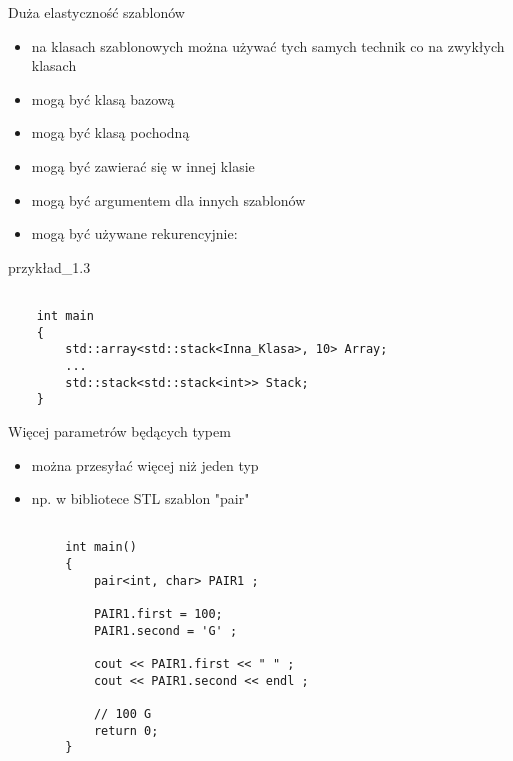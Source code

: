 \documentclass[11pt]{beamer}
\begin{document}
\begin{frame}[fragile]{Duża elastyczność szablonów}
	\begin{itemize}
		\item na klasach szablonowych można używać tych samych technik co na zwykłych klasach
		\item mogą być klasą bazową
		\item mogą być klasą pochodną
		\item mogą być zawierać się w innej klasie
		\item mogą być argumentem dla innych szablonów
		\item mogą być używane rekurencyjnie: 
	\end{itemize}
	\alert{przykład\_1.3}
	
	\begin{lstlisting}[frame=single]  % Start your code-block
		
	int main
	{
		std::array<std::stack<Inna_Klasa>, 10> Array;
		...
		std::stack<std::stack<int>> Stack;
	}
	\end{lstlisting}

\end{frame}



\begin{frame}[fragile]{Więcej parametrów będących typem}
	\begin{itemize}
		\item można przesyłać więcej niż jeden typ
		\item np. w bibliotece STL szablon "pair"
			
	\end{itemize}
	
	\begin{lstlisting}[frame=single]  % Start your code-block
		
		int main()
		{
			pair<int, char> PAIR1 ;
		 
			PAIR1.first = 100;
			PAIR1.second = 'G' ;
		 
			cout << PAIR1.first << " " ;
			cout << PAIR1.second << endl ;
		 
		 	// 100 G		 
			return 0;
		}
	\end{lstlisting}

\end{frame}
\end{document}
